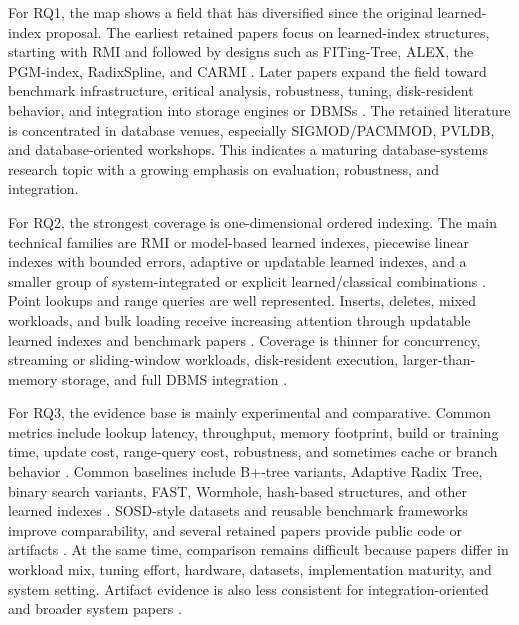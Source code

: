 \documentclass[a4paper, 12pt, twoside]{report}
\begin{document}
For RQ1, the map shows a field that has diversified since the original learned-index proposal. The earliest retained papers focus on learned-index structures, starting with RMI and followed by designs such as FITing-Tree, ALEX, the PGM-index, RadixSpline, and CARMI \cite{kraska2018,galakatos2019fiting,ding2020alex,ferragina2020pgm,kipf2020radixspline,zhang2022carmi}. Later papers expand the field toward benchmark infrastructure, critical analysis, robustness, tuning, disk-resident behavior, and integration into storage engines or DBMSs \cite{marcus2020benchmarking,maltry2022critical,wongkham2022ready,sun2023learned,lan2023disk,chatterjee2024limousine,wang2025tuning,luo2025robustness,maharjan2023learnedstore,fuad2026postlearn}. The retained literature is concentrated in database venues, especially SIGMOD/PACMMOD, PVLDB, and database-oriented workshops. This indicates a maturing database-systems research topic with a growing emphasis on evaluation, robustness, and integration.

For RQ2, the strongest coverage is one-dimensional ordered indexing. The main technical families are RMI or model-based learned indexes, piecewise linear indexes with bounded errors, adaptive or updatable learned indexes, and a smaller group of system-integrated or explicit learned/classical combinations \cite{kraska2018,galakatos2019fiting,ferragina2020pgm,kipf2020radixspline,ding2020alex,zhang2022carmi,li2023dili,liang2024swix,maharjan2023learnedstore,chatterjee2024limousine}. Point lookups and range queries are well represented. Inserts, deletes, mixed workloads, and bulk loading receive increasing attention through updatable learned indexes and benchmark papers \cite{ding2020alex,wongkham2022ready,sun2023learned,li2023dili,luo2025robustness}. Coverage is thinner for concurrency, streaming or sliding-window workloads, disk-resident execution, larger-than-memory storage, and full DBMS integration \cite{liang2024swix,lan2023disk,chatterjee2024limousine,fuad2026postlearn}.

For RQ3, the evidence base is mainly experimental and comparative. Common metrics include lookup latency, throughput, memory footprint, build or training time, update cost, range-query cost, robustness, and sometimes cache or branch behavior \cite{marcus2020benchmarking,sun2023learned,wongkham2022ready,lan2023disk,luo2025robustness}. Common baselines include B+-tree variants, Adaptive Radix Tree, binary search variants, FAST, Wormhole, hash-based structures, and other learned indexes \cite{kraska2018,marcus2020benchmarking,sun2023learned}. SOSD-style datasets and reusable benchmark frameworks improve comparability, and several retained papers provide public code or artifacts \cite{marcus2020benchmarking,sun2023learned,wongkham2022ready,liang2024swix,luo2025robustness}. At the same time, comparison remains difficult because papers differ in workload mix, tuning effort, hardware, datasets, implementation maturity, and system setting. Artifact evidence is also less consistent for integration-oriented and broader system papers \cite{chatterjee2024limousine,fuad2026postlearn}.
\end{document}
